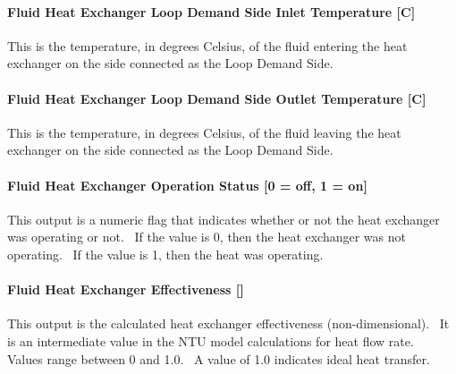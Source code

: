 \paragraph{Fluid Heat Exchanger Loop Demand Side Inlet Temperature {[}C{]}}\label{fluid-heat-exchanger-loop-demand-side-inlet-temperature-c}

This is the temperature, in degrees Celsius, of the fluid entering the heat exchanger on the side connected as the Loop Demand Side.

\paragraph{Fluid Heat Exchanger Loop Demand Side Outlet Temperature {[}C{]}}\label{fluid-heat-exchanger-loop-demand-side-outlet-temperature-c}

This is the temperature, in degrees Celsius, of the fluid leaving the heat exchanger on the side connected as the Loop Demand Side.

\paragraph{Fluid Heat Exchanger Operation Status {[}0 = off, 1 = on{]}}\label{fluid-heat-exchanger-operation-status-0-off-1-on}

This output is a numeric flag that indicates whether or not the heat exchanger was operating or not.~ If the value is 0, then the heat exchanger was not operating.~ If the value is 1, then the heat was operating.

\paragraph{Fluid Heat Exchanger Effectiveness {[]}}\label{fluid-heat-exchanger-effectiveness}

This output is the calculated heat exchanger effectiveness (non-dimensional).~ It is an intermediate value in the NTU model calculations for heat flow rate.~ Values range between 0 and 1.0.~ A value of 1.0 indicates ideal heat transfer.